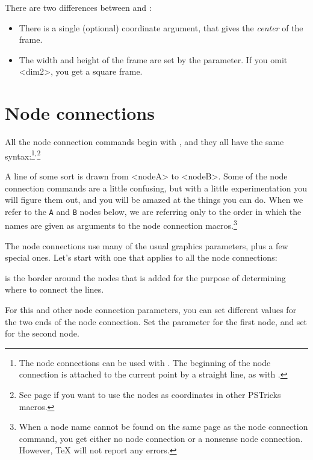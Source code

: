 \documentclass[11pt,english,BCOR10mm,DIV12,bibliography=totoc,parskip=false,smallheadings
    headexclude,footexclude,oneside]{pst-doc}
\begin{document}
There are two differences between  and :
\begin{itemize}
  \item There is a single (optional) coordinate argument, that gives the
  \emph{center} of the frame.
  \item The width and height of the frame are set by the
   parameter. If you omit <dim2>, you get a square frame.
\end{itemize}


\section{Node connections}\label{S-nc}

All the node connection commands begin with , and they all have the same
syntax:\footnote{%
The node connections can be used with . The beginning of the node
connection is attached to the current point by a straight line, as with
.}$^,$\footnote{%
See page  \protect\pageref{S-SpecialCoor} if you want to use the nodes as
coordinates in other PSTricks macros.}

\begin{BDef}
  \OptArgs{}
\end{BDef}

A line of some sort is drawn from <nodeA> to <nodeB>. Some of the node
connection commands are a little confusing, but with a little experimentation
you will figure them out, and you will be amazed at the things you can do.
When we refer to the \verb|A| and \verb|B| nodes below, we are referring only to the
order in which the names are given as arguments to the node connection
macros.\footnote{%
When a node name cannot be found on the same page as the node connection
command, you get either no node connection or a nonsense node connection.
However, \TeX{} will not report any errors.}

The node connections use many of the usual graphics parameters, plus a few
special ones. Let's start with one that applies to all the node connections:

 is the border around the nodes that is added for the purpose of
determining where to connect the lines.

For this and other node connection parameters, you can set different values
for the two ends of the node connection. Set the parameter  for
the first node, and set  for the second node.
\end{document}
